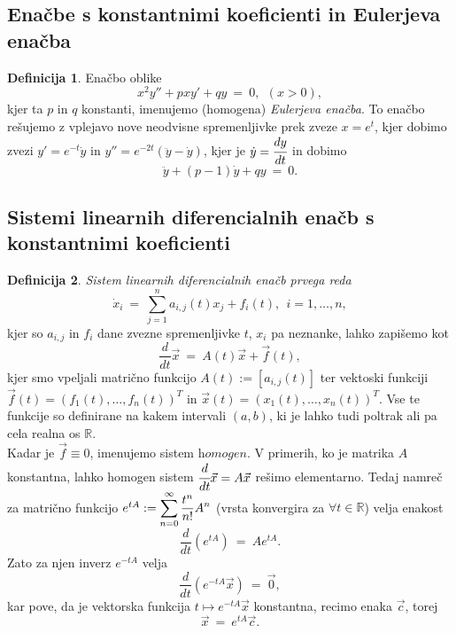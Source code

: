 \documentclass[11pt]{article}
\theoremstyle{definition}
\newtheorem{definicija}{Definicija}[section]
\theoremstyle{definition}
\theoremstyle{definition}
\begin{document}

\subsection{Enačbe s konstantnimi koeficienti in Eulerjeva enačba}
\vspace{0.5cm}

\begin{definicija}

Enačbo oblike 
$$x^2 y'' + p x y' + q y ~=~ 0, ~~(x > 0),$$
kjer ta $p$ in $q$ konstanti, imenujemo (homogena) \textit{Eulerjeva enačba}. To enačbo rešujemo z vplejavo nove neodvisne spremenljivke prek zveze $x = e^t$, kjer dobimo zvezi $y' = e^{-t} \dot{y}$ in $y'' = e^{-2t}(\ddot{y} - \dot{y})$, kjer je $\dot{y} = \cfrac{dy}{dt}$ in dobimo
$$\ddot{y} + (p-1) \dot{y} + q y ~=~ 0.$$

\end{definicija}


\subsection{Sistemi linearnih diferencialnih enačb s konstantnimi koeficienti}
\vspace{0.5cm}

\begin{definicija}

\textit{Sistem linearnih diferencialnih enačb prvega reda}
$$\dot{x}_i ~=~ \sum_{j=1}^n a_{i,j}(t)x_j + f_i(t), ~~i = 1, \ldots, n,$$
kjer so $a_{i,j}$ in $f_i$ dane zvezne spremenljivke $t$, $x_i$ pa neznanke, lahko zapišemo kot
$$\frac{d}{dt}\vec{x} ~=~ A(t)\vec{x} + \vec{f}(t),$$
kjer smo vpeljali matrično funkcijo $A(t) := [a_{i,j}(t)]$ ter vektoski funkciji $\vec{f}(t) = (f_1(t), \ldots, f_n(t))^T$ in $\vec{x}(t) = (x_1(t), \ldots, x_n(t))^T$. Vse te funkcije so definirane na kakem intervali $(a, b)$, ki je lahko tudi poltrak ali pa cela realna os $\mathbb{R}$. \\

\noindent Kadar je $\vec{f} \equiv 0$, imenujemo sistem $\textit{homogen}$. V primerih, ko je matrika $A$ konstantna, lahko homogen sistem $\cfrac{d}{dt}\vec{x} = A\vec{x}$ rešimo elementarno. Tedaj namreč za matrično funkcijo $e^{tA} := \mathlarger{\sum_{n=0}^{\infty} \frac{t^n}{n!} A^n}$ (vrsta konvergira za $\forall t \in \mathbb{R}$) velja enakost
$$\frac{d}{dt}\left( e^{tA} \right) ~=~ A e^{tA}.$$
Zato za njen inverz $e^{-tA}$ velja
$$\frac{d}{dt}\left( e^{-tA} \vec{x} \right) ~=~ \vec{0},$$
kar pove, da je vektorska funkcija $t \mapsto e^{-tA}\vec{x}$ konstantna, recimo enaka $\vec{c}$, torej 
$$\vec{x} ~=~ e^{tA}\vec{c}.$$

\end{definicija}
\vspace{0.5cm}
\end{document}
